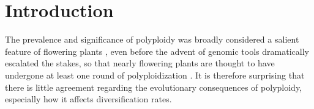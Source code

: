 \section{Introduction}


%
%

The prevalence and significance of polyploidy was broadly considered a salient feature of flowering plants \citep{}, even before the advent of genomic tools dramatically escalated the stakes, so that nearly flowering plants are thought to have undergone at least one round of polyploidization \citep{}.
It is therefore surprising that there is little agreement regarding the evolutionary consequences of polyploidy, especially how it affects diversification rates. %

